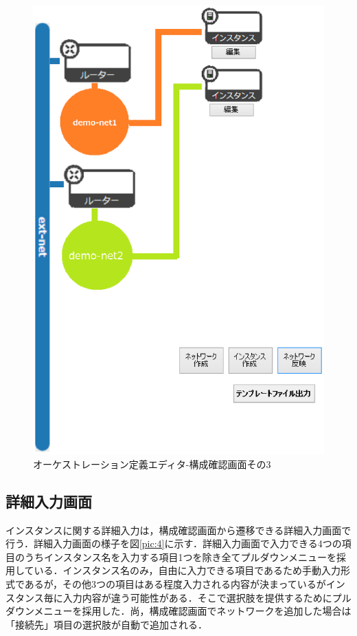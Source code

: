 \documentclass[mingoth]{kut-paper}		%
\begin{document}
		\begin{figure}[H]
			\begin{center}
				\includegraphics[scale=0.55]{Document/構成確認画面3.eps}
				\caption{オーケストレーション定義エディタ-構成確認画面その3}
				\label{pic:3}
			\end{center}
		\end{figure}
		
		\subsection{詳細入力画面}
		インスタンスに関する詳細入力は，構成確認画面から遷移できる詳細入力画面で行う．詳細入力画面の様子を図\ref{pic:4}に示す．詳細入力画面で入力できる4つの項目のうちインスタンス名を入力する項目1つを除き全てプルダウンメニューを採用している．インスタンス名のみ，自由に入力できる項目であるため手動入力形式であるが，その他3つの項目はある程度入力される内容が決まっているがインスタンス毎に入力内容が違う可能性がある．そこで選択肢を提供するためにプルダウンメニューを採用した．尚，構成確認画面でネットワークを追加した場合は「接続先」項目の選択肢が自動で追加される．
		
\end{document}

